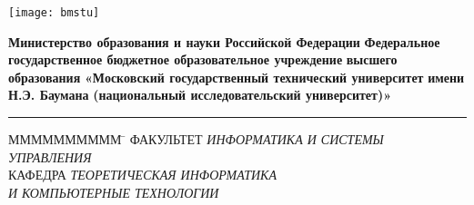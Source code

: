 \begin{titlepage}	%



% 
\noindent\begin{minipage}{0.15\textwidth}%
\texttt{[image: bmstu]}
\end{minipage}%
\hfill%
\begin{minipage}{0.85\textwidth}\raggedleft
    \begin{center}
        \textbf{Министерство образования и науки Российской Федерации}
        \textbf{Федеральное государственное бюджетное образовательное учреждение}
        \textbf{высшего образования}
        \textbf{«Московский государственный технический университет}
        \textbf{имени Н.Э. Баумана}
        \textbf{(национальный исследовательский университет)»} 
    \end{center}
\end{minipage}

\par\noindent\rule{\textwidth}{0.4pt}

\begin{flushleft}
\begin{tabbing}
ММММММММММ \= \kill
\large{ФАКУЛЬТЕТ} \> \large{\textit{ИНФОРМАТИКА И СИСТЕМЫ}} \\ \> \large{\textit{УПРАВЛЕНИЯ}} \\	\large{КАФЕДРА} \> \large{\textit{ТЕОРЕТИЧЕСКАЯ ИНФОРМАТИКА}} \\
 \> \large{\textit{И КОМПЬЮТЕРНЫЕ ТЕХНОЛОГИИ}}
\\[1.0cm]
\end{tabbing}
\end{flushleft}

    


\end{titlepage}
